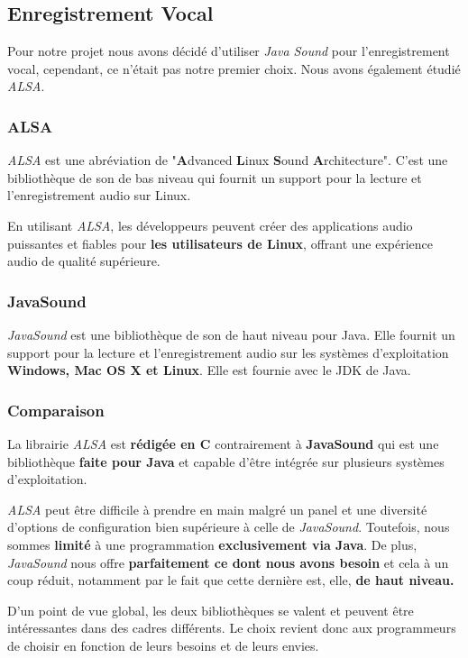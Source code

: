 \subsection{Enregistrement Vocal}
\label{subsec:Enregistrement}

Pour notre projet nous avons décidé d'utiliser \textit{Java Sound} pour l'enregistrement vocal, cependant,
ce n'était pas notre premier choix. Nous avons également étudié \textit{ALSA}.

\subsubsection*{ALSA}

\textit{ALSA} est une abréviation de "\textbf{A}dvanced \textbf{L}inux \textbf{S}ound \textbf{A}rchitecture". C'est une bibliothèque de son
de bas niveau qui fournit un support pour la lecture et l'enregistrement audio sur Linux.

En utilisant \textit{ALSA}, les développeurs peuvent créer des applications audio puissantes et fiables pour \textbf{les utilisateurs de Linux},
offrant une expérience audio de qualité supérieure.

\subsubsection*{JavaSound}

\textit{JavaSound} est une bibliothèque de son de haut niveau pour Java. Elle fournit un support pour la lecture et l'enregistrement audio sur
les systèmes d'exploitation \textbf{Windows, Mac OS X et Linux}. Elle est fournie avec le JDK de Java.

\subsubsection*{Comparaison}
La librairie \textit{ALSA} est \textbf{rédigée en C} contrairement à \textbf{JavaSound} qui est une bibliothèque
\textbf{faite pour Java} et capable d'être intégrée sur plusieurs systèmes d'exploitation.

\textit{ALSA} peut être difficile à prendre en main malgré un panel et une diversité d'options de configuration bien supérieure à celle de \textit{JavaSound}.
Toutefois, nous sommes \textbf{limité} à une programmation \textbf{exclusivement via Java}. De plus, \textit{JavaSound} nous offre \textbf{parfaitement ce
      dont nous avons besoin} et cela à un coup réduit, notamment par le fait que cette dernière est, elle, \textbf{de haut niveau.}

D'un point de vue global, les deux bibliothèques se valent et peuvent être intéressantes dans des cadres différents.
Le choix revient donc aux programmeurs de choisir en fonction de leurs besoins et de leurs envies.
